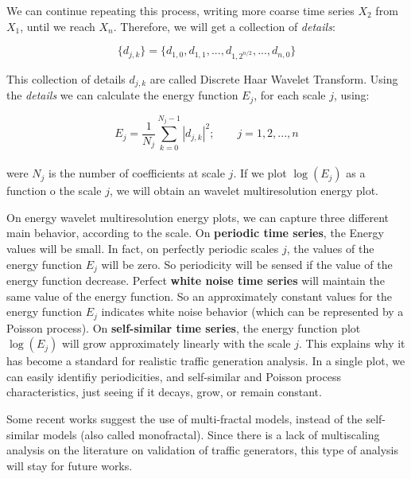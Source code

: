 We can continue repeating this process, writing more coarse time series $X_{2}$ from $X_{1}$, until we reach $X_{n}$. Therefore, we will get a collection of \textit{details}:

\begin{equation}
\{d_{j,k}\} = \{ d_{1,0}, d_{1,1}, ..., d_{1,2^{n/2}}, ..., d_{n, 0} \}
\end{equation} 


This collection of details ${d_{j,k}}$ are called Discrete Haar Wavelet Transform. Using the \textit{details} we can calculate the energy function $E_{j}$, for each scale $j$, using:

\begin{equation}
E_{j} = \frac{1}{N_{j}} \sum_{k = 0}^{N_{j} - 1} |d_{j,k}|^{2}; \qquad j = 1, 2, ..., n
\end{equation} 
\\ 
were $N_{j}$ is the number of coefficients at scale $j$. If we plot $\log(E_{j})$ as a function o the scale $j$, we will obtain an wavelet multiresolution energy plot. 

On energy wavelet multiresolution energy plots, we can capture three different main behavior, according to the scale.  On \textbf{periodic time series}, the Energy values will be small. In fact, on perfectly periodic scales $j$, the values of the energy function $E_{j}$ will be zero. So periodicity will be sensed if the value of the energy function decrease. Perfect \textbf{white noise time series} will maintain the same value of the energy function. So an approximately constant values for the energy function $E_{j}$ indicates white noise behavior (which can be represented by a Poisson process\cite{poisson-white-noise}). On \textbf{self-similar time series}, the energy function plot $\log(E_{j})$ will grow approximately linearly with the scale $j$.  This explains why it has become a standard for realistic traffic generation analysis. In a single plot, we can easily identifiy periodicities, and self-similar and Poisson process characteristics, just seeing if it decays, grow, or remain constant.

Some recent works suggest the use of multi-fractal models, instead of the self-similar models (also called monofractal)\cite{validate-trafficgen}\cite{udp-flows-model}. Since there is a lack of multiscaling analysis on the literature on validation of traffic generators, this type of analysis will stay for future works. 

